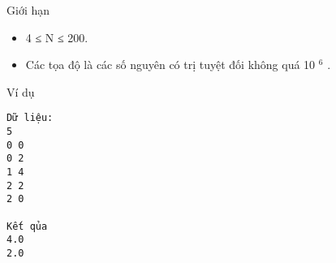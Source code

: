 Giới hạn
\begin{itemize}
	\item     4 ≤ N ≤ 200.   
	\item     Các tọa độ là các số nguyên có trị tuyệt đối không quá 10    $^     6    $    .   
\end{itemize}
Ví dụ
\begin{verbatim}
Dữ liệu:
5
0 0
0 2
1 4
2 2
2 0

Kết qủa
4.0
2.0
\end{verbatim}